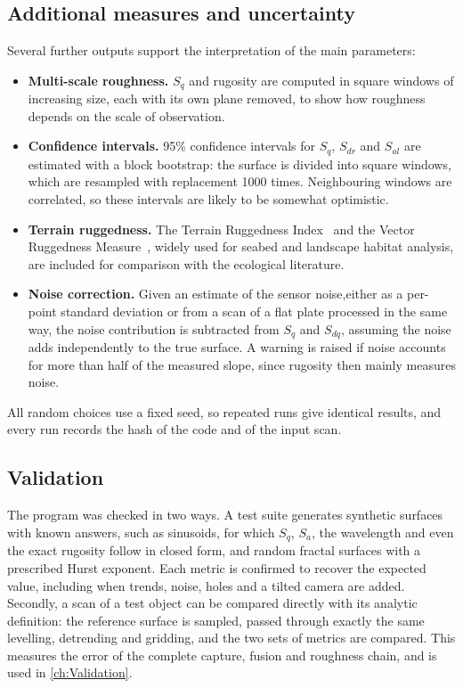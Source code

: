 \subsection{Additional measures and uncertainty}

Several further outputs support the interpretation of the main parameters:

\begin{itemize}
	\item \textbf{Multi-scale roughness.} $S_q$ and rugosity are computed in square windows of increasing size, each with its own plane removed, to show how roughness depends on the scale of observation.
	
	\item \textbf{Confidence intervals.} 95\% confidence intervals for $S_q$, $S_{dr}$ and $S_{al}$ are estimated with a block bootstrap: the surface is divided into square windows, which are resampled with replacement 1000 times. Neighbouring windows are correlated, so these intervals are likely to be somewhat optimistic.
	
	\item \textbf{Terrain ruggedness.} The Terrain Ruggedness Index~\cite{riley1999index} and the Vector Ruggedness Measure~\cite{sappingtonQuantifyingLandscapeRuggedness2007}, widely used for seabed and landscape 	habitat analysis, are included for comparison with the ecological literature.
	
	\item \textbf{Noise correction.} Given an estimate of the sensor noise,either as a per-point standard deviation or from a scan of a flat plate processed in the same way, the noise contribution is subtracted from $S_q$ and $S_{dq}$, assuming the noise adds independently to the true surface. A warning is raised if noise accounts for more than half of the measured slope, since rugosity then mainly measures noise.
\end{itemize}

All random choices use a fixed seed, so repeated runs give identical results, and every run records the hash of the code and of the input scan.

\subsection{Validation}

The program was checked in two ways. A test suite generates synthetic surfaces with known answers, such as sinusoids, for which $S_q$, $S_a$, the wavelength and even the exact rugosity follow in closed form, and random fractal surfaces with a prescribed Hurst exponent. Each metric is confirmed to recover the expected value, including when trends, noise, holes and a tilted camera are added. Secondly, a scan of a test object can be compared directly with its analytic definition: the reference surface is sampled, passed through exactly the same levelling, detrending and gridding, and the two sets of metrics are compared. This measures the error of the complete capture, fusion and roughness chain, and is used in \autoref{ch:Validation}.

